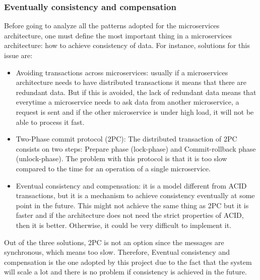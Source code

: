 \subsubsection{Eventually consistency and compensation}
Before going to analyze all the patterns adopted for the microservices architecture, one must define the most important thing in a microservices architecture: how to achieve consistency of data. For instance, solutions for this issue are:
\begin{itemize}
\item Avoiding transactions across microservices: usually if a microservices architecture needs to have distributed transactions 
it means that there are redundant data. But if this is avoided, the lack of redundant data means that everytime a microservice needs 
to ask data from another microservice, a request is sent and if the other microservice is under high load, it will not be able to 
process it fast.
\item Two-Phase commit protocol (2PC): The distributed transaction of 2PC consists on two steps: Prepare phase (lock-phase) 
and Commit-rollback phase (unlock-phase). The problem with this protocol is that it is too slow compared to the time for an 
operation of a single microservice.
\item Eventual consistency and compensation: it is a model different from ACID transactions, but it is a mechanism to 
achieve consistency eventually at some point in the future. This might not achieve the same thing as 2PC but it is faster and if 
the architecture does not need the strict properties of ACID, then it is better. Otherwise, it could be very difficult to implement it.
\end{itemize}
Out of the three solutions, 2PC is not an option since the messages are synchronous, which means too slow. Therefore, Eventual consistency and compensation is the one adopted by this project due to the fact that the system will scale a lot and there is no problem if consistency is achieved in the future.


